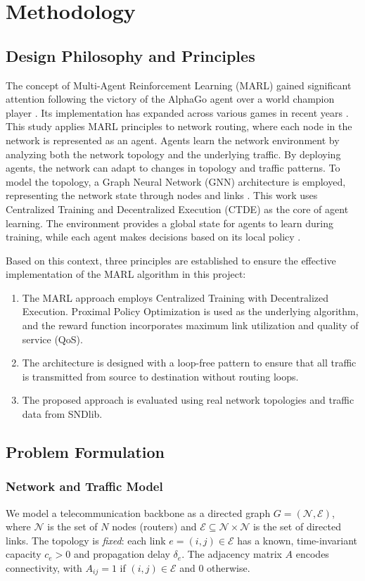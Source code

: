 \section{Methodology}
\subsection{Design Philosophy and Principles}
The concept of Multi-Agent Reinforcement Learning (MARL) gained significant attention following the victory of the AlphaGo agent over a world champion player \cite{shaheen2026reinforcementlearningstrategybasedatari}. Its implementation has expanded across various games in recent years \cite{marl-book}. This study applies MARL principles to network routing, where each node in the network is represented as an agent. Agents learn the network environment by analyzing both the network topology and the underlying traffic. By deploying agents, the network can adapt to changes in topology and traffic patterns. To model the topology, a Graph Neural Network (GNN) architecture is employed, representing the network state through nodes and links \cite{Rusek_2020}. This work uses Centralized Training and Decentralized Execution (CTDE) as the core of agent learning. The environment provides a global state for agents to learn during training, while each agent makes decisions based on its local policy \cite{marl-book}.

Based on this context, three principles are established to ensure the effective implementation of the MARL algorithm in this project:
\begin{enumerate}
    \item The MARL approach employs Centralized Training with Decentralized Execution. Proximal Policy Optimization is used as the underlying algorithm, and the reward function incorporates maximum link utilization and quality of service (QoS).
    \item The architecture is designed with a loop-free pattern to ensure that all traffic is transmitted from source to destination without routing loops.
    \item The proposed approach is evaluated using real network topologies and traffic data from SNDlib.
\end{enumerate}

\subsection{Problem Formulation}
\subsubsection{Network and Traffic Model}
We model a telecommunication backbone as a directed graph
$G=(\mathcal{N},\mathcal{E})$, where $\mathcal{N}$ is the set of $N$ nodes
(routers) and $\mathcal{E}\subseteq\mathcal{N}\times\mathcal{N}$ is the set of
directed links. The topology is \emph{fixed}: each link
$e=(i,j)\in\mathcal{E}$ has a known, time-invariant capacity $c_e>0$ and
propagation delay $\delta_e$. The adjacency matrix $A$ encodes connectivity,
with $A_{ij}=1$ if $(i,j)\in\mathcal{E}$ and $0$ otherwise.

